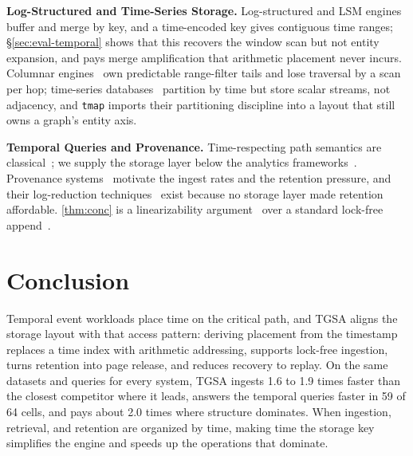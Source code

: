 \documentclass[sigconf,nonacm]{acmart}
\newcommand{\sys}{TGSA\xspace}
\newcommand{\tmap}{\texttt{tmap}\xspace}
\newcommand{\nIngestGapLo}{1.6}     %
\newcommand{\nIngestGapHi}{1.9}
\newcommand{\nStructuralGap}{2.0}   %
\begin{document}
\textbf{Log-Structured and Time-Series Storage.} Log-structured and LSM
engines~\cite{rosenblum1991lfs, oneil1996lsm, dong2021rocksdb} buffer and merge by key,
and a time-encoded key gives contiguous time ranges;
\S\ref{sec:eval-temporal} shows that this recovers the window scan but
not entity expansion, and pays merge amplification that arithmetic
placement never incurs. Columnar engines~\cite{raasveldt2019duckdb} own
predictable range-filter tails and lose traversal by a scan per hop;
time-series databases~\cite{pelkonen2015gorilla}
partition by time but store scalar streams, not adjacency, and \tmap imports their partitioning discipline into a
layout that still owns a graph's entity axis.

\textbf{Temporal Queries and Provenance.} Time-respecting path
semantics are classical~\cite{kempe2002temporal, wu2014temporalpaths,
holme2012temporal, wu2016topchain}; we supply the storage layer below the analytics
frameworks~\cite{shun2013ligra, kyrola2012graphchi}. Provenance
systems~\cite{king2003backtracker, pasquier2017camflow, zhang2025tapas,
hassan2020omegalog, hassan2019nodoze, milajerdi2019holmes} motivate the ingest rates and the retention
pressure, and their log-reduction techniques~\cite{lee2013loggc} exist
because no storage layer made retention affordable. \cref{thm:conc} is
a linearizability argument~\cite{herlihy1990linearizability} over a
standard lock-free append~\cite{michael1996nonblocking}.

\section{Conclusion}\label{sec:conclusion}
Temporal event workloads place time on the critical path, and \sys
aligns the storage layout with that access pattern: deriving placement
from the timestamp replaces a time index with arithmetic addressing,
supports lock-free ingestion, turns retention into page release, and
reduces recovery to replay. On the same datasets and queries for every
system, \sys ingests \nIngestGapLo{} to \nIngestGapHi{} times faster
than the closest competitor where it leads, answers the temporal
queries faster in 59 of 64 cells, and pays about \nStructuralGap{}
times where structure dominates. When ingestion, retrieval, and retention are organized by time,
making time the storage key simplifies the engine and speeds up the
operations that dominate.



\end{document}
